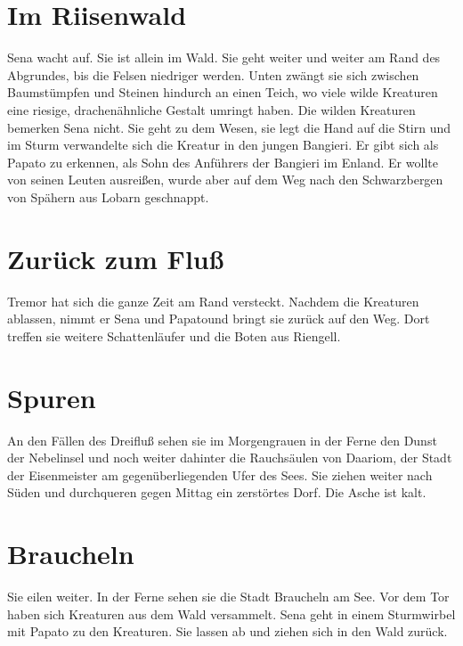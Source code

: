 \documentclass[12pt,a4paper,onecolumn,twoside,ngerman]{book}
\newcommand{\Sena}{Sena}
\newcommand{\Bangiri}{Bangieri}
\newcommand{\Papato}{Papato}
\newcommand{\Enland}{Enland}
\newcommand{\Schattenlaufer}{Schattenläufer}
\newcommand{\Tremor}{Tremor}
\newcommand{\Lobarn}{Lobarn}
\newcommand{\Rhingell}{Riengell}
\newcommand{\Dreifluss}{Dreifluß}
\newcommand{\Braucheln}{Braucheln}
\newcommand{\Riesenwald}{Riisenwald}
\newcommand{\Eisenmeister}{Eisenmeister}
\newcommand{\Dariom}{Daariom}
\begin{document}
\section{Im \Riesenwald}
{\Sena} wacht auf. Sie ist allein im Wald. Sie geht weiter und weiter am Rand des Abgrundes, bis die Felsen niedriger werden. Unten zwängt sie sich zwischen Baumstümpfen und Steinen hindurch an einen Teich, wo viele wilde Kreaturen eine riesige, drachenähnliche Gestalt umringt haben.\linebreak
Die wilden Kreaturen bemerken {\Sena} nicht. Sie geht zu dem Wesen, sie legt die Hand auf die Stirn und im Sturm verwandelte sich die Kreatur in den jungen {\Bangiri}. Er gibt sich als {\Papato} zu erkennen, als Sohn des Anführers der {\Bangiri} im {\Enland}. Er wollte von seinen Leuten ausreißen, wurde aber auf dem Weg nach den Schwarzbergen von Spähern aus {\Lobarn} geschnappt. 

\section{Zurück zum Fluß}
{\Tremor} hat sich die ganze Zeit am Rand versteckt. Nachdem die Kreaturen ablassen, nimmt er {\Sena} und \Papato  und bringt sie zurück auf den Weg. Dort treffen sie weitere {\Schattenlaufer} und die Boten aus {\Rhingell}.

\section{Spuren}
An den Fällen des {\Dreifluss} sehen sie im Morgengrauen in der Ferne den Dunst der Nebelinsel und noch weiter dahinter die Rauchsäulen von {\Dariom}, der Stadt der {\Eisenmeister} am gegenüberliegenden Ufer des Sees.\linebreak
Sie ziehen weiter nach Süden und durchqueren gegen Mittag ein zerstörtes Dorf. Die Asche ist kalt.

\section{\Braucheln}
Sie eilen weiter. In der Ferne sehen sie die Stadt {\Braucheln} am See. Vor dem Tor haben sich Kreaturen aus dem Wald versammelt. {\Sena} geht in einem Sturmwirbel mit {\Papato} zu den Kreaturen. Sie lassen ab und ziehen sich in den Wald zurück.

\end{document}

